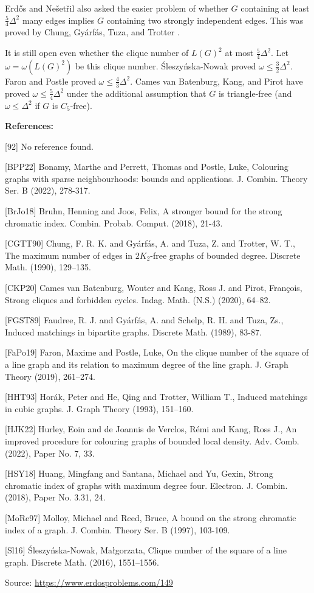 \documentclass{article}
\begin{document}
Erd\H{o}s and Ne\v{s}et\v{r}il also asked the easier problem of whether $G$ containing at least $\tfrac{5}{4}\Delta^2$ many edges implies $G$ containing two strongly independent edges. This was proved by Chung, Gy\'{a}rf\'{a}s, Tuza, and Trotter \cite{CGTT90}.

It is still open even whether the clique number of $L(G)^2$ at most $\frac{5}{4}\Delta^2$. Let $\omega=\omega(L(G)^2)$ be this clique number. \'{S}leszy\'{n}ska-Nowak \cite{Sl16} proved $\omega \leq \frac{3}{2}\Delta^2$. Faron and Postle \cite{FaPo19} proved $\omega\leq \frac{4}{3}\Delta^2$. Cames van Batenburg, Kang, and Pirot \cite{CKP20} have proved $\omega\leq \frac{5}{4}\Delta^2$ under the additional assumption that $G$ is triangle-free (and $\omega\leq \Delta^2$ if $G$ is $C_5$-free).

\bigskip
\noindent\textbf{References:}

[92] No reference found.

 [BPP22] Bonamy, Marthe and Perrett, Thomas and Postle, Luke, Colouring graphs with sparse neighbourhoods: bounds and
applications. J. Combin. Theory Ser. B (2022), 278-317.
 
 [BrJo18] Bruhn, Henning and Joos, Felix, A stronger bound for the strong chromatic index. Combin. Probab. Comput. (2018), 21-43.
 
 [CGTT90] Chung, F. R. K. and Gy\'{a}rf\'{a}s, A. and Tuza, Z. and Trotter,
W. T., The maximum number of edges in {$2K_2$}-free graphs of bounded
degree. Discrete Math. (1990), 129--135.
 
 [CKP20] Cames van Batenburg, Wouter and Kang, Ross J. and Pirot,
Fran\c cois, Strong cliques and forbidden cycles. Indag. Math. (N.S.) (2020), 64--82.
 
 [FGST89] Faudree, R. J. and Gy\'{a}rf\'{a}s, A. and Schelp, R. H. and Tuza,
Zs., Induced matchings in bipartite graphs. Discrete Math. (1989), 83-87.
 
 [FaPo19] Faron, Maxime and Postle, Luke, On the clique number of the square of a line graph and its
relation to maximum degree of the line graph. J. Graph Theory (2019), 261--274.
 
 [HHT93] Hor\'{a}k, Peter and He, Qing and Trotter, William T., Induced matchings in cubic graphs. J. Graph Theory (1993), 151--160.
 
 [HJK22] Hurley, Eoin and de Joannis de Verclos, R\'{e}mi and Kang, Ross
J., An improved procedure for colouring graphs of bounded local
density. Adv. Comb. (2022), Paper No. 7, 33.
 
 [HSY18] Huang, Mingfang and Santana, Michael and Yu, Gexin, Strong chromatic index of graphs with maximum degree four. Electron. J. Combin. (2018), Paper No. 3.31, 24.
 
 [MoRe97] Molloy, Michael and Reed, Bruce, A bound on the strong chromatic index of a graph. J. Combin. Theory Ser. B (1997), 103-109.
 
 [Sl16] \'Sleszy\'nska-Nowak, Ma\l gorzata, Clique number of the square of a line graph. Discrete Math. (2016), 1551--1556.

\bigskip
\noindent\small{Source: \url{https://www.erdosproblems.com/149}}
\end{document}
